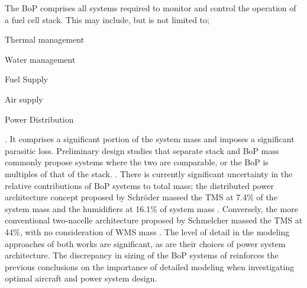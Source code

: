 The BoP comprises all systems required to monitor and control the operation of a fuel cell stack. This may include, but is not limited to; \begin{enumerate*}
	\item Thermal management
	\item Water management
	\item Fuel Supply
	\item Air supply
	\item Power Distribution
\end{enumerate*}. It comprises a significant portion of the system mass and imposes a significant parasitic loss. Preliminary design studies that separate stack and BoP mass commonly propose systems where the two are comparable, or the BoP is multiples of that of the stack. \cite{schroderOptimalDesignProton2024, parkRefinedSizingMethod2022, schmelcherHydrogenFuelCells2022a}.
There is currently significant uncertainty in the relative contributions of BoP systems to total mass;
the distributed power architecture concept proposed by Schr\"oder \etal massed the TMS at 7.4\% of the system mass and the humidifiers at 16.1\% of system mass \cite{schroderOptimalDesignProton2024}.
Conversely, the more conventional two-nacelle architecture proposed by Schmelcher massed the TMS at 44\%, with no consideration of WMS mass \cite{schmelcherHydrogenFuelCells2022a}.
The level of detail in the modeling approaches of both works are significant, as are their choices of power system architecture.
The discrepancy in sizing of the BoP systems of reinforces the previous conclusions on the importance of detailed modeling when investigating optimal aircraft and power system design.

